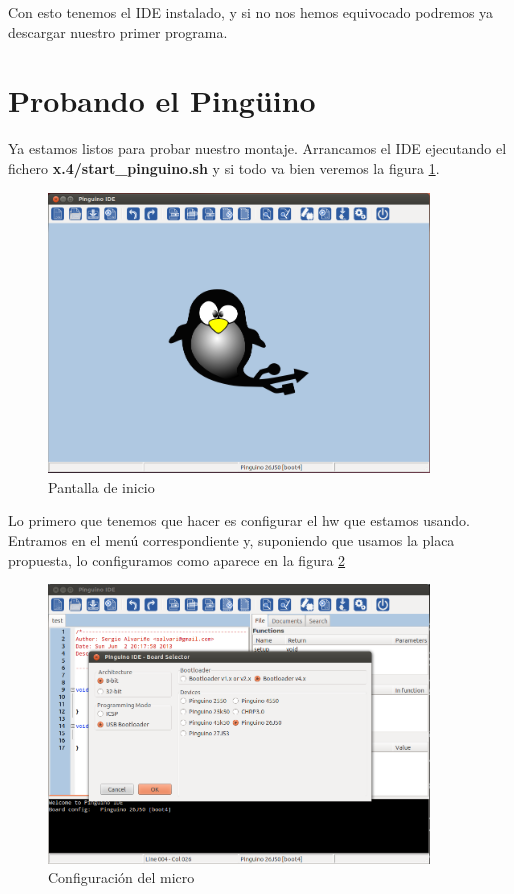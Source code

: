\documentclass[12pt,a4paper,twoside,DIV=15]{scrartcl}
\begin{document}
Con esto tenemos el IDE instalado, y si no nos hemos equivocado
podremos ya descargar nuestro primer programa.

\section{Probando el Pingüino}
\label{sec:primer_programa}

Ya estamos listos para probar nuestro montaje. Arrancamos el IDE
ejecutando el fichero \textbf{x.4/start\_pinguino.sh} y si todo va
bien veremos la figura \ref{fig:arranque}.

\begin{figure}
  \centering
  \caption{Pantalla de inicio}
  \label{fig:arranque}
  \includegraphics [width=0.9\textwidth]{Pinguino_IDE_inicio.png}
\end{figure}

Lo primero que tenemos que hacer es configurar el hw que estamos
usando. Entramos en el menú correspondiente y, suponiendo que usamos
la placa propuesta, lo configuramos como aparece en la figura
\ref{fig:cfg_micro}

\begin{figure}
  \centering
  \caption{Configuración del micro}
  \label{fig:cfg_micro}
  \includegraphics [width=0.9\textwidth]{Pinguino_IDE_cfg_micro.png}
\end{figure}
\end{document}
